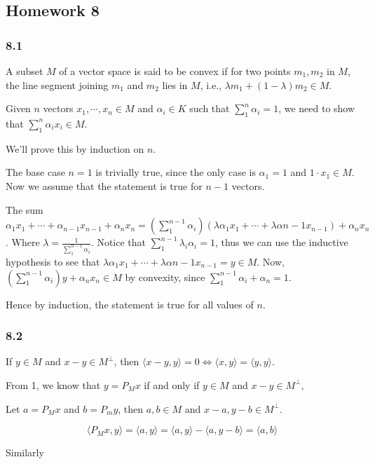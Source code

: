 \documentclass[11pt]{article}
\begin{document}
\subsection{Homework 8}
\label{sec:orgae9832a}
\subsubsection{8.1}
\label{sec:org4a6d2aa}
A subset \(M\) of a vector space is said to be convex if for two points \(m_1,
    m_2\) in \(M\), the line segment joining \(m_1\) and \(m_2\) lies in \(M\), i.e.,
\(\lambda m_1 + (1-\lambda)m_2 \in M\).

Given \(n\) vectors \(x_1, \cdots, x_n\in M\) and \(\alpha_i \in K\) such that
\(\sum_1^n \alpha_i = 1\), we need to show that \(\sum_1^n \alpha_i x_i \in M\).

We'll prove this by induction on \(n\).

The base case \(n=1\) is trivially true, since the only case is \(\alpha_1 = 1\)
and \(1\cdot x_1 \in M\). Now we assume that the statement is true for \(n-1\)
vectors.

The sum \(\alpha_1x_1 + \cdots + \alpha_{n-1}x_{n-1} + \alpha_nx_n=
    (\sum_1^{n-1}\alpha_i)(\lambda\alpha_1 x_1 + \cdots +
    \lambda\alpha{n-1}x_{n-1}) + \alpha_n x_n\). Where \(\lambda =
    \frac{1}{\sum_1^{n-1} \alpha_i}\). Notice that \(\sum_1^{n-1} \lambda_i
    \alpha_i = 1\), thus we can use the inductive hypothesis to see that
\(\lambda\alpha_1 x_1 + \cdots + \lambda\alpha{n-1}x_{n-1} = y \in M\). Now,
\((\sum_1^{n-1}\alpha_i)y + \alpha_n x_n \in M\) by convexity, since
\(\sum_1^{n-1}\alpha_i + \alpha_n = 1\).

Hence by induction, the statement is true for all values of \(n\).
\subsubsection{8.2}
\label{sec:orge9017af}
If \(y \in M\) and \(x - y \in M^{\perp}\), then \(\langle x - y, y \rangle = 0
    \iff \langle x, y \rangle = \langle y, y \rangle\).

From 1, we know that \(y = P_Mx\) if and only if \(y \in M\) and \(x - y \in
    M^\perp\),

Let \(a = P_M x\) and \(b = P_m y\), then \(a, b \in M\) and \(x-a, y-b \in
    M^\perp\).

$$\langle P_M x, y \rangle = \langle a, y \rangle = \langle a, y \rangle - \langle a, y - b \rangle =
    \langle a, b\rangle$$

Similarly
\end{document}
